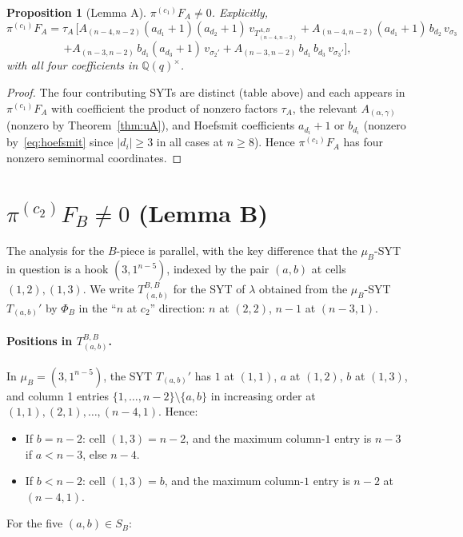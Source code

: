 \documentclass[11pt]{article}
\newtheorem{proposition}[theorem]{Proposition}
\theoremstyle{definition}
\begin{document}
\begin{proposition}[Lemma A]\label{prop:LemmaA}
$\pi^{(c_1)} F_A \ne 0$. Explicitly,
\[
   \pi^{(c_1)} F_A
   = \tau_A\,\big[
        A_{(n-4,n-2)} (a_{d_1}{+}1)(a_{d_2}{+}1)\, v_{T^{A,B}_{(n-4,n-2)}}
        + A_{(n-4,n-2)} (a_{d_1}{+}1)\, b_{d_2}\, v_{\sigma_3}
\]
\[
        + A_{(n-3,n-2)}\, b_{d_1}(a_{d_3}{+}1)\, v_{\sigma_2'}
        + A_{(n-3,n-2)}\, b_{d_1}\, b_{d_3}\, v_{\sigma_3'}
     \big],
\]
with all four coefficients in $\mathbb{Q}(q)^\times$.
\end{proposition}

\begin{proof}
The four contributing SYTs are distinct
(table above) and each appears in $\pi^{(c_1)} F_A$ with coefficient
the product of nonzero factors $\tau_A$, the relevant
$A_{(\alpha,\gamma)}$ (nonzero by Theorem~\ref{thm:uA}), and
Hoefsmit coefficients $a_{d_i}{+}1$ or $b_{d_i}$ (nonzero
by~\eqref{eq:hoefsmit} since $|d_i| \ge 3$ in all cases at
$n \ge 8$). Hence $\pi^{(c_1)} F_A$ has four nonzero seminormal
coordinates.
\end{proof}

\section{$\pi^{(c_2)} F_B \ne 0$ (Lemma B)}\label{sec:LemmaB}

The analysis for the $B$-piece is parallel, with the key difference
that the $\mu_B$-SYT in question is a hook $(3, 1^{n-5})$, indexed
by the pair $(a, b)$ at cells $(1, 2), (1, 3)$. We write
$T^{B,B}_{(a, b)}$ for the SYT of $\lambda$ obtained from the
$\mu_B$-SYT $T_{(a, b)}'$ by $\Phi_B$ in the
``$n$ at $c_2$'' direction: $n$ at $(2, 2)$, $n-1$ at $(n-3, 1)$.

\paragraph{Positions in $T^{B,B}_{(a, b)}$.}
In $\mu_B = (3, 1^{n-5})$, the SYT $T_{(a, b)}'$ has $1$ at
$(1,1)$, $a$ at $(1, 2)$, $b$ at $(1, 3)$, and column 1
entries $\{1, \ldots, n-2\} \setminus \{a, b\}$ in increasing order
at $(1, 1), (2, 1), \ldots, (n-4, 1)$. Hence:
\begin{itemize}[leftmargin=2em,topsep=0.3em,itemsep=0.2em]
\item If $b = n-2$: cell $(1, 3) = n-2$, and the maximum
column-$1$ entry is $n-3$ if $a < n-3$, else $n-4$.
\item If $b < n-2$: cell $(1, 3) = b$, and the maximum
column-$1$ entry is $n-2$ at $(n-4, 1)$.
\end{itemize}
For the five $(a, b) \in S_B$:
\end{document}
